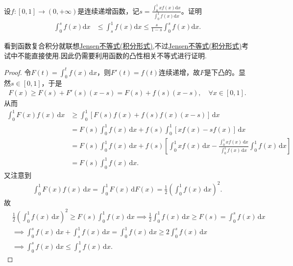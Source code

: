 \documentclass[../../main.tex]{subfiles}%
\begin{document}
\begin{example}
设$f:[0,1]\to(0,+\infty)$是连续递增函数，记$s = \frac{\int_{0}^{1}xf(x)\mathrm{d}x}{\int_{0}^{1}f(x)\mathrm{d}x}$。证明
\begin{align*}
\int_{0}^{s}f(x)\mathrm{d}x&\leqslant\int_{s}^{1}f(x)\mathrm{d}x\leqslant\frac{s}{1 - s}\int_{0}^{s}f(x)\mathrm{d}x.
\end{align*}
\end{example}
\begin{note}
看到函数复合积分就联想\hyperref[theorem:Jensen不等式积分形式]{Jensen不等式(积分形式)},不过\hyperref[theorem:Jensen不等式积分形式]{Jensen不等式(积分形式)}考试中不能直接使用.因此仍需要利用函数的凸性相关不等式进行证明.
\end{note}
\begin{proof}
令$F(t) = \int_0^t f(x) \, \mathrm{d}x$，则$F'(t) = f(t)$连续递增，故$F$是下凸的。显然$s \in [0,1]$，于是
\begin{align*}
F(x) \geqslant  F(s) + F'(s)(x - s) = F(s) + f(s)(x - s), \quad \forall x \in [0,1].
\end{align*}
从而
\begin{align*}
\int_0^1 F(x) f(x) \, \mathrm{d}x &\geqslant  \int_0^1 \left[ F(s) f(x) + f(s) f(x)(x - s) \right] \, \mathrm{d}x \\
&= F(s) \int_0^1 f(x) \, \mathrm{d}x + f(s) \int_0^1 \left[ x f(x) - s f(x) \right] \, \mathrm{d}x \\
&= F(s) \int_0^1 f(x) \, \mathrm{d}x + f(s) \left[ \int_0^1 x f(x) \, \mathrm{d}x - \frac{\int_0^1 x f(x) \, \mathrm{d}x}{\int_0^1 f(x) \, \mathrm{d}x} \int_0^1 f(x) \, \mathrm{d}x \right] \\
&= F(s) \int_0^1 f(x) \, \mathrm{d}x.
\end{align*}
又注意到
\begin{align*}
\int_0^1 F(x) f(x) \, \mathrm{d}x = \int_0^1 F(x) \, \mathrm{d}F(x) = \frac{1}{2} \left( \int_0^1 f(x) \, \mathrm{d}x \right)^2.
\end{align*}
故
\begin{align*}
&\frac{1}{2} \left( \int_0^1 f(x) \, \mathrm{d}x \right)^2 \geqslant  F(s) \int_0^1 f(x) \, \mathrm{d}x \implies \frac{1}{2} \int_0^1 f(x) \, \mathrm{d}x \geqslant  F(s) = \int_0^s f(x) \, \mathrm{d}x \\
&\implies \int_0^s f(x) \, \mathrm{d}x + \int_s^1 f(x) \, \mathrm{d}x = \int_0^1 f(x) \, \mathrm{d}x \geqslant  2 \int_0^s f(x) \, \mathrm{d}x \\
&\implies \int_0^s f(x) \, \mathrm{d}x \leqslant  \int_s^1 f(x) \, \mathrm{d}x.

\end{align*}
\end{proof}
\end{document}
